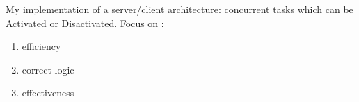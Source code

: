 \begin{frame}
    My implementation of a server/client architecture: concurrent tasks which can be Activated or Disactivated.
    Focus on :
    \begin{enumerate}
        \item efficiency
        \item correct logic
        \item effectiveness
    \end{enumerate}
\end{frame}